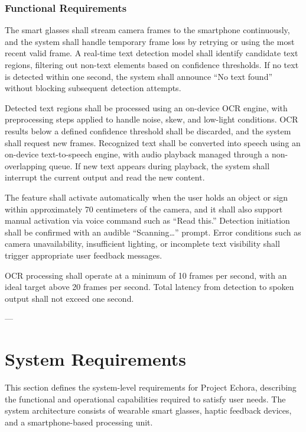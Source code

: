\subsubsection{Functional Requirements}

The smart glasses shall stream camera frames to the smartphone continuously, and the system shall handle temporary frame loss by retrying or using the most recent valid frame. A real-time text detection model shall identify candidate text regions, filtering out non-text elements based on confidence thresholds. If no text is detected within one second, the system shall announce “No text found” without blocking subsequent detection attempts.

Detected text regions shall be processed using an on-device OCR engine, with preprocessing steps applied to handle noise, skew, and low-light conditions. OCR results below a defined confidence threshold shall be discarded, and the system shall request new frames. Recognized text shall be converted into speech using an on-device text-to-speech engine, with audio playback managed through a non-overlapping queue. If new text appears during playback, the system shall interrupt the current output and read the new content.

The feature shall activate automatically when the user holds an object or sign within approximately 70 centimeters of the camera, and it shall also support manual activation via voice command such as “Read this.” Detection initiation shall be confirmed with an audible “Scanning…” prompt. Error conditions such as camera unavailability, insufficient lighting, or incomplete text visibility shall trigger appropriate user feedback messages.

OCR processing shall operate at a minimum of 10 frames per second, with an ideal target above 20 frames per second. Total latency from detection to spoken output shall not exceed one second.

---

\section{System Requirements}

This section defines the system-level requirements for Project Echora, describing the functional and operational capabilities required to satisfy user needs. The system architecture consists of wearable smart glasses, haptic feedback devices, and a smartphone-based processing unit.

